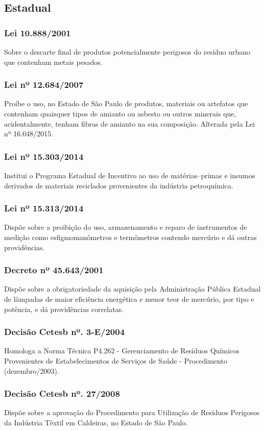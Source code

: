 \begin{subapend}
	\subsection{Estadual}
	\begin{subsubapend}
		\item \subsubsection{Lei 10.888/2001}
		Sobre o descarte final de produtos potencialmente perigosos do resíduo urbano que contenham metais pesados.
		\subsubsection{Lei nº 12.684/2007}
		Proíbe o uso, no Estado de São Paulo de produtos, materiais ou artefatos que contenham quaisquer tipos de amianto ou asbesto ou outros minerais que, acidentalmente, tenham fibras de amianto na sua composição. Alterada pela Lei nº 16.048/2015.
		\subsubsection{Lei nº 15.303/2014}
		Institui o Programa Estadual de Incentivo ao uso de matérias–primas e insumos derivados de materiais reciclados provenientes da indústria petroquímica.
		\subsubsection{Lei nº 15.313/2014}
		Dispõe sobre a proibição do uso, armazenamento e reparo de instrumentos de medição como esfigmomanômetros e termômetros contendo mercúrio e dá outras providências.
		\subsubsection{Decreto nº 45.643/2001}
		Dispõe sobre a obrigatoriedade da aquisição pela Administração Pública Estadual de lâmpadas de maior eficiência energética e menor teor de mercúrio, por tipo e potência, e dá providências correlatas.
		\subsubsection{Decisão Cetesb nº. 3-E/2004}
		Homologa a Norma Técnica P4.262 - Gerenciamento de Resíduos Químicos Provenientes de Estabelecimentos de Serviços de Saúde - Procedimento (dezembro/2003).
		\subsubsection{Decisão Cetesb nº. 27/2008}
		Dispõe sobre a aprovação do Procedimento para Utilização de Resíduos Perigosos da Indústria Têxtil em Caldeiras, no Estado de São Paulo.

\end{subsubapend}
\end{subapend}

